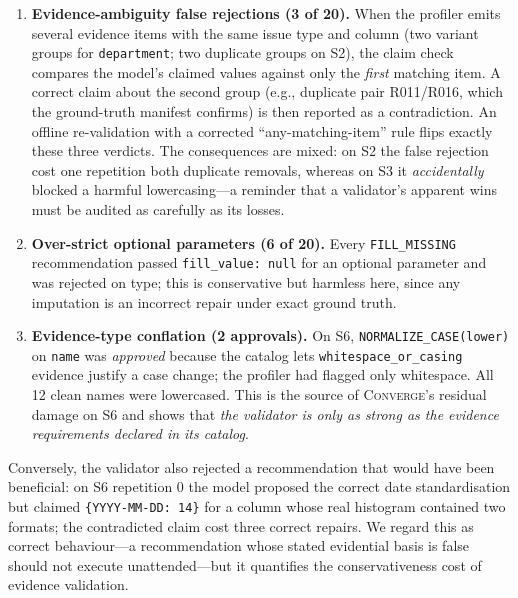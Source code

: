 \begin{enumerate}[leftmargin=*,nosep]
  \item \textbf{Evidence-ambiguity false rejections (3 of 20).} When the profiler emits several evidence items with the same issue type and column (two variant groups for \texttt{department}; two duplicate groups on S2), the claim check compares the model's claimed values against only the \emph{first} matching item. A correct claim about the second group (e.g., duplicate pair R011/R016, which the ground-truth manifest confirms) is then reported as a contradiction. An offline re-validation with a corrected ``any-matching-item'' rule flips exactly these three verdicts. The consequences are mixed: on S2 the false rejection cost one repetition both duplicate removals, whereas on S3 it \emph{accidentally} blocked a harmful lowercasing---a reminder that a validator's apparent wins must be audited as carefully as its losses.
  \item \textbf{Over-strict optional parameters (6 of 20).} Every \texttt{FILL\_MISSING} recommendation passed \texttt{fill\_value: null} for an optional parameter and was rejected on type; this is conservative but harmless here, since any imputation is an incorrect repair under exact ground truth.
  \item \textbf{Evidence-type conflation (2 approvals).} On S6, \texttt{NORMALIZE\_CASE(lower)} on \texttt{name} was \emph{approved} because the catalog lets \texttt{whitespace\_or\_casing} evidence justify a case change; the profiler had flagged only whitespace. All 12 clean names were lowercased. This is the source of \textsc{Converge}'s residual damage on S6 and shows that \emph{the validator is only as strong as the evidence requirements declared in its catalog}.
\end{enumerate}
Conversely, the validator also rejected a recommendation that would have been beneficial: on S6 repetition 0 the model proposed the correct date standardisation but claimed \texttt{\{YYYY-MM-DD: 14\}} for a column whose real histogram contained two formats; the contradicted claim cost three correct repairs. We regard this as correct behaviour---a recommendation whose stated evidential basis is false should not execute unattended---but it quantifies the conservativeness cost of evidence validation.

